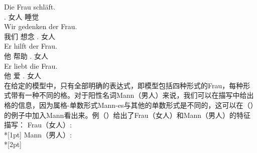 \eal\settowidth{}
\ex 
\gll Die        Frau schläft. \\      
     .\nom{} 女人 睡觉\\
\ex 
\gll Wir gedenken der Frau. \\ 
     我们 想念 .\gen{} 女人\\
\ex 
\gll Er hilft der Frau.  \\    
     他 帮助 .\dat{} 女人\\
\ex 
\gll Er liebt die Frau.   \\   
     他 爱 .\acc{} 女人\\
\zl
在给定的模型中，只有全部明确的表达式，即模型包括四种形式的Frau，每种形式带有一种不同的格。对于阳性名词Mann（男人）来说，我们可以在描写中给出格的信息，因为属格-单数形式Mann-es与其他的单数形式是不同的，这可以在（）的例子中加入Mann看出来。例（）给出了Frau（女人）和Mann（男人）的特征描写：
\eal
\ex\label{avm-frau}
Frau（女人）:\\*[1pt]
\ex\label{avm-mann}
Mann（男人）:\\*[2pt]
